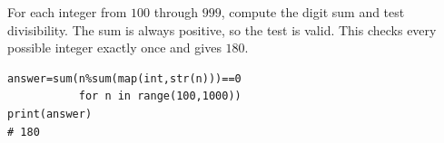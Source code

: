 For each integer from $100$ through $999$, compute the digit sum and test divisibility. The sum is always positive, so the test is valid. This checks every possible integer exactly once and gives $\boxed{180}$.
\begin{verbatim}
answer=sum(n%sum(map(int,str(n)))==0
           for n in range(100,1000))
print(answer)
# 180
\end{verbatim}

